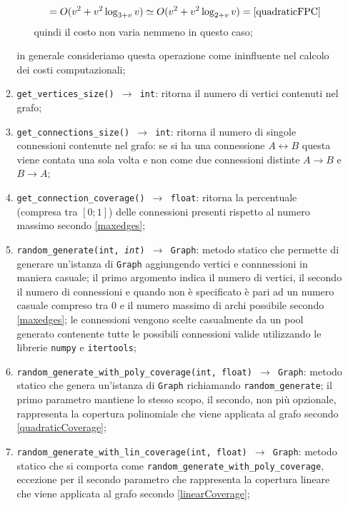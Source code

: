 \begin{enumerate}
\begin{enumerate}[resume]
\begin{itemize}
\begin{equation}
\begin{aligned}
                                                                   & = O(v^2 + v^2\log_{3+v}v) \simeq O(v^2 + v^2\log_{2+v}v) = \eqref{quadraticFPC}
                                          \end{aligned}
                                    \end{equation}
                                    quindi il costo non varia nemmeno in questo caso;
                        \end{itemize}
                        in generale consideriamo questa operazione come ininfluente nel calcolo dei costi computazionali;
                  \item \texttt{get\_vertices\_size() $\rightarrow$ int}: ritorna il numero di vertici contenuti nel grafo;
                  \item \texttt{get\_connections\_size() $\rightarrow$ int}: ritorna il numero di singole connessioni contenute nel grafo:
                        se si ha una connessione $A \leftrightarrow B$ questa viene contata una sola volta e non come due connessioni distinte
                        $A \rightarrow B$ e $B \rightarrow A$;
                  \item \texttt{get\_connection\_coverage() $\rightarrow$ float}: ritorna la percentuale (compresa tra $[0;1]$) delle connessioni
                        presenti rispetto al numero massimo secondo \eqref{maxedges};
                  \item \texttt{random\_generate(int, \textit{int}) $\rightarrow$ Graph}: metodo statico che permette di generare un'istanza
                        di \texttt{Graph} aggiungendo vertici e connnessioni in maniera casuale; il primo argomento indica il numero di vertici, il secondo
                        il numero di connessioni e quando non è specificato è pari ad un numero casuale compreso tra 0 e il numero massimo di
                        archi possibile secondo \eqref{maxedges}; le connessioni vengono scelte casualmente da un pool generato contenente tutte le possibili
                        connessioni valide utilizzando le librerie \texttt{numpy} e \texttt{itertools};
                  \item \texttt{random\_generate\_with\_poly\_coverage(int, float) $\rightarrow$ Graph}: metodo statico che genera un'istanza
                        di \texttt{Graph} richiamando \texttt{random\_generate}; il primo parametro mantiene lo stesso scopo, il secondo, non più
                        opzionale, rappresenta la copertura polinomiale che viene applicata al grafo secondo \eqref{quadraticCoverage};
                  \item \texttt{random\_generate\_with\_lin\_coverage(int, float) $\rightarrow$ Graph}: metodo statico che si comporta come
                        \texttt{random\_generate\_with\_poly\_coverage}, eccezione per il secondo parametro che rappresenta la copertura lineare
                        che viene applicata al grafo secondo \eqref{linearCoverage};
            \end{enumerate}
\end{enumerate}

